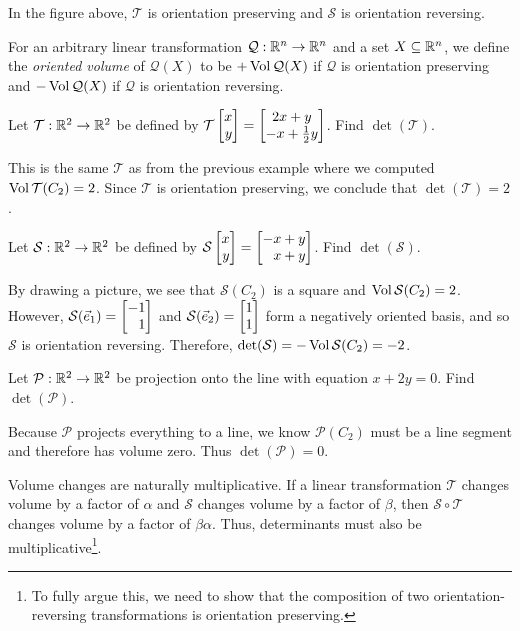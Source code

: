 In the figure above, $\mathcal T$ is orientation preserving and $\mathcal S$ is orientation reversing.

For an arbitrary linear transformation $\mathcal Q:\mathbb{R}^n\to\mathbb{R}^n$ and a set $X\subseteq\mathbb{R}^n$, we
define the \emph{oriented volume} of $\mathcal Q(X)$ to be $+\operatorname{Vol}\mathcal Q(X)$ if $\mathcal Q$ is
orientation preserving and $-\operatorname{Vol}\mathcal Q(X)$ if $\mathcal Q$ is orientation reversing.


\begin{example}
	Let $\mathcal T:\mathbb{R}^2\to\mathbb{R}^2$ be defined by $\mathcal T\mat{x\\y}=\matc{2x+y\\-x+\tfrac{1}{2}y}$.
	Find $\det(\mathcal T)$.

	This is the same $\mathcal T$ as from the previous example where we computed
	$\operatorname{Vol}\mathcal T(C_2)=2$. Since $\mathcal T$ is orientation preserving, we conclude that $\det(\mathcal T)=2$.
\end{example}
\begin{example}
	Let $\mathcal S:\mathbb{R}^2\to\mathbb{R}^2$ be defined by $\mathcal S\mat{x\\y}=\mat{-x+y\\x+y}$.
	Find $\det(\mathcal S)$.

	By drawing a picture, we see that $\mathcal S(C_2)$ is a square and $\operatorname{Vol}\mathcal S(C_2)=2$.
	However, $\mathcal S(\xhat) = \mat{-1\\1}$ and $\mathcal S(\yhat) = \mat{1\\1}$
	form a negatively oriented basis, and so $\mathcal S$ is orientation reversing. Therefore,
	$\det(\mathcal S) = - \operatorname{Vol}\mathcal S(C_2) = -2$.
\end{example}
\begin{example}
	Let $\mathcal P:\mathbb{R}^2\to\mathbb{R}^2$ be projection onto the line with equation $x+2y=0$. Find $\det(\mathcal P)$.

	Because $\mathcal P$ projects everything to a line, we know $\mathcal P(C_2)$ must be a line segment and
	therefore has volume zero. Thus $\det(\mathcal P)=0$.
\end{example}



Volume changes are naturally multiplicative. If a linear transformation $\mathcal T$ changes volume by a factor
of $\alpha$ and $\mathcal S$ changes volume by a factor of $\beta$, then $\mathcal S\circ \mathcal T$ changes
volume by a factor of $\beta\alpha$. Thus, determinants must also be multiplicative\footnote{ To fully argue this, we need
to show that the composition of two orientation-reversing transformations is orientation preserving.}.

